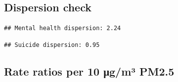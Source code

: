 \documentclass[
]{article}
\newenvironment{Shaded}{\begin{snugshade}}{\end{snugshade}}
\newcommand{\DecValTok}[1]{\textcolor[rgb]{0.00,0.00,0.81}{#1}}
\newcommand{\FunctionTok}[1]{\textcolor[rgb]{0.13,0.29,0.53}{\textbf{#1}}}
\newcommand{\NormalTok}[1]{#1}
\newcommand{\SpecialCharTok}[1]{\textcolor[rgb]{0.81,0.36,0.00}{\textbf{#1}}}
\newcommand{\StringTok}[1]{\textcolor[rgb]{0.31,0.60,0.02}{#1}}
\begin{document}
\subsection{Dispersion check}\label{dispersion-check}

\begin{Shaded}
\end{Shaded}

\begin{verbatim}
## Mental health dispersion: 2.24
\end{verbatim}

\begin{Shaded}
\end{Shaded}

\begin{verbatim}
## Suicide dispersion: 0.95
\end{verbatim}

\subsection{Rate ratios per 10 μg/m³
PM2.5}\label{rate-ratios-per-10-ux3bcgmuxb3-pm2.5}
\end{document}
